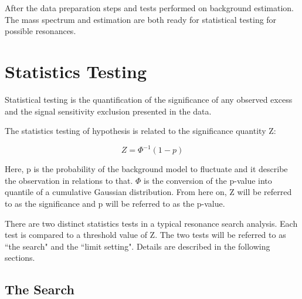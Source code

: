 After the data preparation steps and tests performed on background estimation. The mass spectrum and estimation are both ready for statistical testing for possible resonances. 

\section{Statistics Testing}
\label{section:stats}
Statistical testing is the quantification of the significance of any observed excess and the signal sensitivity exclusion presented in the data.

The statistics testing of hypothesis is related to the significance quantity Z:

\begin{equation}
 Z= \Phi^{-1}(1-p) 
 \label{eq:significance}
\end{equation}

Here, p is the probability of the background model to fluctuate and it describe the observation in relations to that. $\Phi$ is the conversion of the p-value into quantile of a cumulative Gaussian distribution. From here on, Z will be referred to as the significance and p will be referred to as the p-value.

There are two distinct statistics tests in a typical resonance search analysis. Each test is compared to a threshold value of Z. The two tests will be referred to as ``the search" and the ``limit setting". Details are described in the following sections.





\subsection{The Search}
\label{sec:thesearch}

